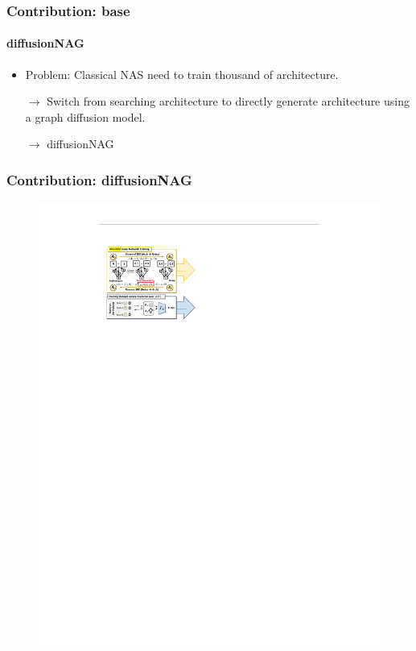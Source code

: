 \documentclass[aspectratio=169,xcolor=dvipsnames]{beamer}
\begin{document}
\begin{frame}
    \frametitle{Contribution: base}
    \framesubtitle{diffusionNAG}
    \begin{itemize}
        \item Problem: Classical NAS need to train thousand of architecture.
        \item [$\rightarrow$] Switch from searching architecture to directly generate architecture using a graph diffusion model.
        \item [$\rightarrow$] diffusionNAG
    \end{itemize}
\end{frame}

\begin{frame}
    \frametitle{Contribution: diffusionNAG}
    \begin{figure}[htbp]
        \centering
        \includegraphics[height=.80\textheight]{diffusionNAG_part1.pdf}
    \end{figure}
\end{frame}
\end{document}
